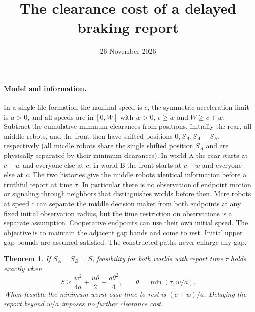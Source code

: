 \documentclass[11pt]{article}
\title{The clearance cost of a delayed braking report}
\author{}
\date{26 November 2026}
\newtheorem{theorem}{Theorem}
\begin{document}
\maketitle
\paragraph{Model and information.}
In a single-file formation the nominal speed is $c$, the symmetric acceleration limit is $a>0$, and all speeds are in $[0,W]$ with $w>0$, $c\ge w$ and $W\ge c+w$. Subtract the cumulative minimum clearances from positions. Initially the rear, all middle robots, and the front then have shifted positions $0,S_A,S_A+S_B$, respectively (all middle robots share the single shifted position $S_A$ and are physically separated by their minimum clearances). In world A the rear starts at $c+w$ and everyone else at $c$; in world B the front starts at $c-w$ and everyone else at $c$. The two histories give the middle robots identical information before a truthful report at time $\tau$. In particular there is no observation of endpoint motion or signaling through neighbors that distinguishes worlds before then. More robots at speed $c$ can separate the middle decision maker from both endpoints at any fixed initial observation radius, but the time restriction on observations is a separate assumption. Cooperative endpoints can use their own initial speed. The objective is to maintain the adjacent gap bands and come to rest. Initial upper gap bounds are assumed satisfied. The constructed paths never enlarge any gap.

\begin{theorem}
If $S_A=S_B=S$, feasibility for both worlds with report time $\tau$ holds exactly when
\[
 S\ge \frac{w^2}{4a}+\frac{w\theta}{2}-\frac{a\theta^2}{4},
 \qquad \theta=\min(\tau,w/a).
\]
When feasible the minimum worst-case time to rest is $(c+w)/a$. Delaying the report beyond $w/a$ imposes no further clearance cost.
\end{theorem}
\end{document}
